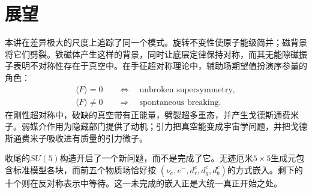 \begin{classroomqa}
\end{classroomqa}

\section{展望}

本讲在差异极大的尺度上追踪了同一个模式。旋转不变性使原子能级简并；磁背景将它们劈裂。铁磁体产生这样的背景，同时让底层定律保持对称，而其无能隙磁振子表明不对称性存在于真空中。在手征超对称理论中，辅助场期望值扮演序参量的角色：
\begin{equation}
\begin{aligned}
\langle F\rangle=0
&\quad\Longleftrightarrow\quad
\text{unbroken supersymmetry},\\
\langle F\rangle\neq0
&\quad\Longrightarrow\quad
\text{spontaneous breaking}.
\end{aligned}
\end{equation}
在刚性超对称中，破缺的真空带有正能量，劈裂超多重态，并产生戈德斯通费米子。弱媒介作用为隐藏部门提供了动机；引力把真空能变成宇宙学问题，并把戈德斯通费米子吸收进有质量的引力微子。

收尾的\(SU(5)\)构造开启了一个新问题，而不是完成了它。无迹厄米\(5\times5\)生成元包含标准模型各块，而前五个物质场恰好按
\((\nu_e,e^-,d^c_r,d^c_g,d^c_b)\)的方式嵌入。剩下的十个则在反对称表示中等待。这一未完成的嵌入正是大统一真正开始之处。
